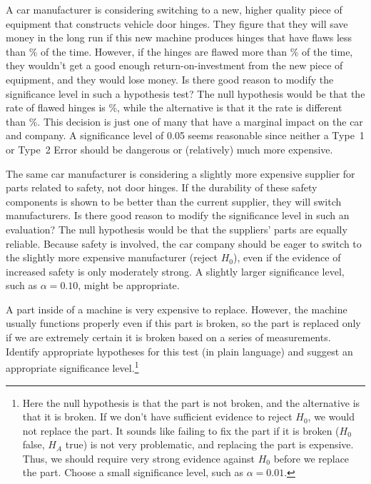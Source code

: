\begin{example}{A car manufacturer is considering switching
    to a new, higher quality piece of equipment that constructs
    vehicle door hinges.
    They figure that they will save money in the long run
    if this new machine produces hinges
    that have flaws less than
    \doorhingeflawrate{}\% of the time.
    However, if the hinges are flawed more than
    \doorhingeflawrate{}\% of
    the time, they wouldn't get a good enough
    return-on-investment from the new piece of equipment,
    and they would lose money.
    Is there good reason to modify the significance level
    in such a hypothesis test?}
  The null hypothesis would be that the rate of flawed
  hinges is \doorhingeflawrate{}\%,
  while the alternative is that it the rate
  is different than \doorhingeflawrate{}\%.
  This decision is just one of many that have a marginal
  impact on the car and company.
  A significance level of 0.05 seems reasonable since
  neither a Type~1 or Type~2 Error should be dangerous
  or (relatively) much more expensive.
\end{example}

\begin{example}{The same car manufacturer is considering
    a slightly more expensive supplier for parts related
    to safety, not door hinges.
    If the durability of these
    safety components is shown to be better than the
    current supplier, they will switch manufacturers.
    Is there good reason to modify the significance level
    in such an evaluation?}
  The null hypothesis would be that the suppliers' parts
  are equally reliable. Because safety is involved,
  the car company should be eager to switch to the slightly
  more expensive manufacturer (reject $H_0$), even if the
  evidence of increased safety is only moderately strong.
  A slightly larger significance level,
  such as $\alpha=0.10$, might be appropriate.
\end{example}

\begin{exercise}
A part inside of a machine is very expensive to replace.
However, the machine usually functions properly even if
this part is broken, so the part is replaced only if we
are extremely certain it is broken based on a series of
measurements.
Identify appropriate hypotheses for this test
(in plain language) and suggest an appropriate significance
level.\footnote{Here
  the null hypothesis is that the part is not broken,
  and the alternative is that it is broken.
  If we don't have sufficient evidence to reject $H_0$,
  we would not replace the part.
  It sounds like failing to fix the part if it is broken
  ($H_0$ false, $H_A$ true) is not very problematic,
  and replacing the part is expensive.
  Thus, we should require very strong evidence against
  $H_0$ before we replace the part.
  Choose a small significance level, such as $\alpha=0.01$.}
\end{exercise}

